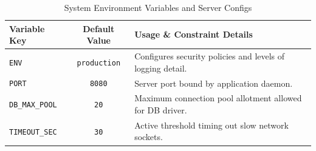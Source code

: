 \begin{table}[htbp]
  \centering
  \caption{System Environment Variables and Server Configs}
  \label{tab:app-envconfig}
  \small
  \renewcommand{\arraystretch}{1.1}
  \begin{tabularx}{\textwidth}{|l|c|X|}
    \hline
    \textbf{Variable Key} & \textbf{Default Value} & \textbf{Usage \& Constraint Details} \\
    \hline
    \texttt{ENV} & \texttt{production} & Configures security policies and levels of logging detail. \\
    \texttt{PORT} & \texttt{8080} & Server port bound by application daemon. \\
    \texttt{DB\_MAX\_POOL} & \texttt{20} & Maximum connection pool allotment allowed for DB driver. \\
    \texttt{TIMEOUT\_SEC} & \texttt{30} & Active threshold timing out slow network sockets. \\
    \hline
  \end{tabularx}
\end{table}
